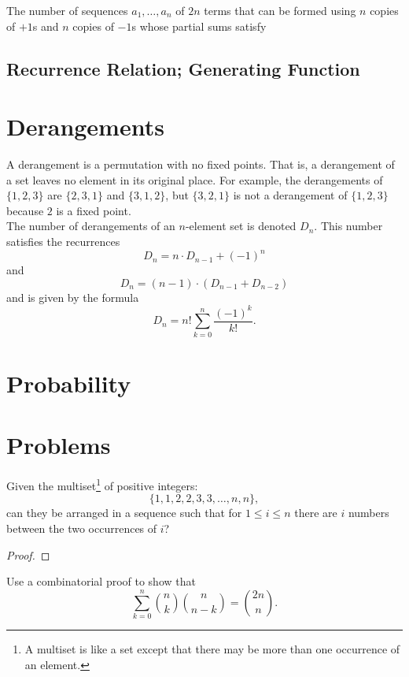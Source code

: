 The number of sequences $a_1, \dots, a_n$ of $2n$ terms that can be formed using $n$ copies of $+1$s and $n$ copies of $-1$s whose partial sums satisfy

\subsection{Recurrence Relation; Generating Function}

\pagebreak

\section{Derangements}
A derangement is a permutation with no fixed points. That is, a derangement of a set leaves no element in its original place. For example, the derangements of $\{1,2,3\}$ are $\{2, 3, 1\}$ and $\{3, 1, 2\}$, but $\{3,2, 1\}$ is not a derangement of $\{1,2,3\}$ because $2$ is a fixed point.\\
The number of derangements of an $n$-element set is denoted $D_n$. This number satisfies the recurrences \[D_n = n \cdot D_{n - 1} + (-1)^n\]
and \[D_n = (n - 1)\cdot (D_{n - 1} + D_{n - 2})\]
and is given by the formula \[D_n = n! \sum_{k=0}^{n} \frac{(-1)^k}{k!}.\]
\pagebreak

\section{Probability}
\pagebreak

\section*{Problems}
\begin{prbm}
Given the multiset\footnote{A multiset is like a set except that there may be more than one occurrence of an element.} of positive integers:
\[ \{1,1,2,2,3,3,\dots,n,n\},\]
can they be arranged in a sequence such that for $1 \le i \le n$ there are $i$ numbers between the two occurrences of $i$?
\end{prbm}

\begin{proof}


\end{proof}
\pagebreak

\begin{prbm} 
Use a combinatorial proof to show that 
\[ \sum_{k=0}^{n} \binom{n}{k}\binom{n}{n-k} = \binom{2n}{n}. \] 
\end{prbm}


